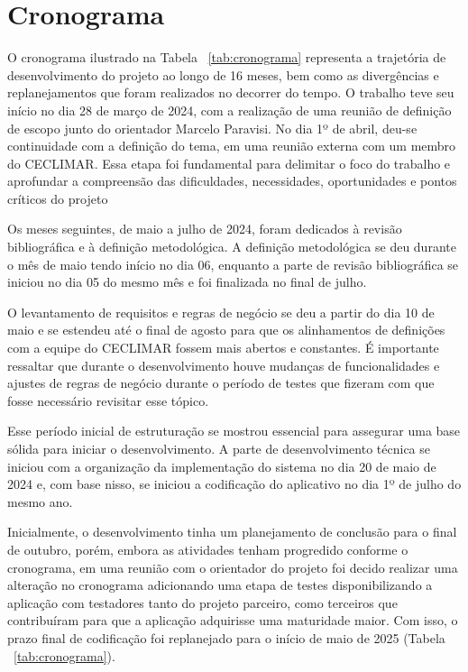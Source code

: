 \chapter{Cronograma}\label{cronograma}
O cronograma ilustrado na Tabela ~\ref{tab:cronograma} representa a trajetória de 
desenvolvimento do projeto ao longo de 16 meses, bem como as divergências e 
replanejamentos que foram realizados no decorrer do tempo. O trabalho teve seu 
início no dia 28 de março de 2024, com a realização de uma reunião de definição 
de escopo junto do orientador Marcelo Paravisi. No dia 1º de abril, deu-se 
continuidade com a definição do tema, em uma reunião externa com um membro do 
CECLIMAR. Essa etapa foi fundamental para delimitar o foco do trabalho e aprofundar 
a compreensão das dificuldades, necessidades, oportunidades e pontos críticos do projeto

Os meses seguintes, de maio a julho de 2024, foram dedicados à revisão bibliográfica 
e à definição metodológica. A definição metodológica se deu durante o mês de maio 
tendo início no dia 06, enquanto a parte de revisão bibliográfica se iniciou no 
dia 05 do mesmo mês e foi finalizada no final de julho. 

O levantamento de requisitos e regras de negócio se deu a partir do dia 10 de 
maio e se estendeu até o final de agosto para que os alinhamentos de definições 
com a equipe do CECLIMAR fossem mais abertos e constantes. É importante ressaltar 
que durante o desenvolvimento houve mudanças de funcionalidades e ajustes de regras 
de negócio durante o período de testes que fizeram com que fosse necessário 
revisitar esse tópico. 

Esse período inicial de estruturação se mostrou essencial para assegurar uma base 
sólida para iniciar o desenvolvimento. A parte de desenvolvimento técnica se 
iniciou com a organização da implementação do sistema no dia 20 de maio de 2024 
e, com base nisso, se iniciou a codificação do aplicativo no dia 1º de julho do mesmo ano. 

Inicialmente, o desenvolvimento tinha um planejamento de conclusão para o final 
de outubro, porém, embora as atividades tenham progredido conforme o cronograma, 
em uma reunião com o orientador do projeto foi decido realizar uma alteração no 
cronograma adicionando uma etapa de testes disponibilizando a aplicação com 
testadores tanto do projeto parceiro, como terceiros que contribuíram para que 
a aplicação adquirisse uma maturidade maior. Com isso, o prazo final de codificação 
foi replanejado para o início de maio de 2025 (Tabela ~\ref{tab:cronograma}).

